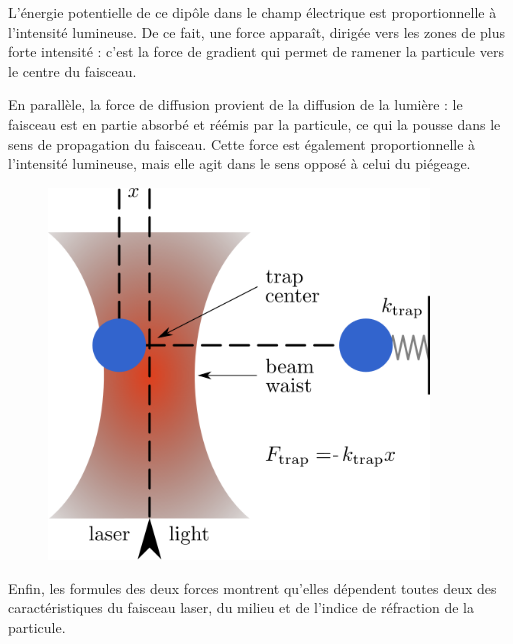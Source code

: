 \begin{minipage}[c]{0.55\textwidth}
    L'énergie potentielle de ce dipôle dans le champ électrique est proportionnelle à l'intensité lumineuse. De ce fait, une force apparaît, dirigée vers les zones de plus forte intensité : c'est la force de gradient qui permet de ramener la particule vers le centre du faisceau.

    En parallèle, la force de diffusion provient de la diffusion de la lumière : le faisceau est en partie absorbé et réémis par la particule, ce qui la pousse dans le sens de propagation du faisceau. Cette force est également proportionnelle à l'intensité lumineuse, mais elle agit dans le sens opposé à celui du piégeage.
\end{minipage}\hfill
\begin{minipage}[c]{0.4\textwidth}
    \begin{figure}[H]
        \begin{center}
            \includegraphics[width=0.9\textwidth]{assets/figures/Introduction/optical_tweezer_theorie.png}
        \end{center}
        \label{optical_tweezer_theorie}
    \end{figure}
\end{minipage}

Enfin, les formules des deux forces montrent qu'elles dépendent toutes deux des caractéristiques du faisceau laser, du milieu et de l'indice de réfraction de la particule.

